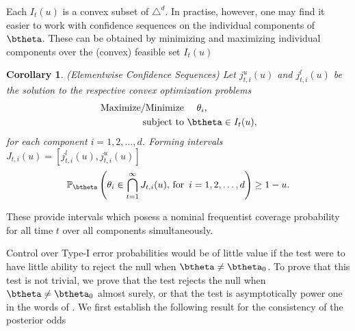 \documentclass[11pt]{article}
\newtheorem{cor}{Corollary}[section]
\begin{document}
\noindent Each $I_t(u)$ is a convex subset of $\triangle^d$.
In practise, however, one may find it easier to work with confidence sequences on the individual components of $\btheta$.
These can be obtained by minimizing and maximizing individual components over the (convex) feasible set $I_t(u)$
\begin{cor}(Elementwise Confidence Sequences)
  \label{thm:elementwise_confidence_sequence}
Let $j^{u}_{t,i}(u)$ and $j^{l}_{t,i}(u)$ be the solution to the respective convex optimization problems 
\begin{align*}
  \text{Maximize/Minimize } & \quad \theta_i, \\
  \text{subject to } & \btheta \in I_t(u),\\
\end{align*}
for each component $i=1,2,\dots,d$. Forming intervals $J_{t,i}(u)=[j^{l}_{t,i}(u), j^{u}_{t,i}(u)]$
\begin{equation}
  \label{eq:marginal_confidence_sequence}
  \mathbb{P}_{\btheta}\left( \theta_i \in \bigcap_{t=1}^{\infty} J_{t,i}(u),\, \text{for }\, i = 1,2, \dots, d \right) \geq 1- u.
\end{equation} 
\end{cor}
\noindent These provide intervals which posess a nominal frequentist coverage probability for all time $t$ over all components simultaneously.

Control over Type-I error probabilities would be of little value if the test were to have little ability to reject the null when $\btheta \neq \btheta_0$.
To prove that this test is not trivial, we prove that the test rejects the null when $\btheta \neq \btheta_0$ almost surely, or that the test is asymptotically power one in the words of \cite{robbins}.
We first establish the following result for the consistency of the posterior odds
\end{document}
